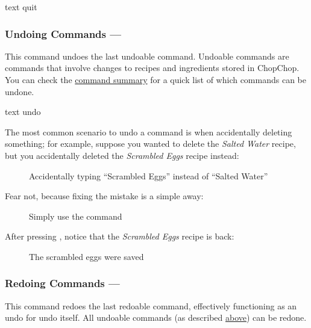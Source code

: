 	 \begin{blockofcode}{text}
		quit
	\end{blockofcode}




\hypertarget{UndoCommand}{}
\subsubsection{Undoing Commands — \texttt{}}

	This command undoes the last undoable command. Undoable commands are commands that involve changes to recipes and ingredients stored in ChopChop. You can check the \hyperlink{CommandSummary}{command summary} for a quick list of which commands can be undone.

	 \begin{blockofcode}{text}
		undo
	\end{blockofcode}

	The most common scenario to undo a command is when accidentally deleting something; for example, suppose you wanted to delete the
	\emph{Salted Water} recipe, but you accidentally deleted the \emph{Scrambled Eggs} recipe instead:

	\begin{figure}[!htbp]\centering\ContinuedFloat*
		\caption{Accidentally typing \enquote{Scrambled Eggs} instead of \enquote{Salted Water}}
	\end{figure}

	\pagebreak
	Fear not, because fixing the mistake is a simple  away:

	\begin{figure}[!htbp]\centering\ContinuedFloat
		\caption{Simply use the  command}
	\end{figure}

	After pressing , notice that the \emph{Scrambled Eggs} recipe is back:

	\begin{figure}[!htbp]\centering\ContinuedFloat
		\caption{The scrambled eggs were saved}
		\vspace{-2em} %
	\end{figure}

\pagebreak
\hypertarget{RedoCommand}{}
\subsubsection{Redoing Commands — \texttt{}}
	This command redoes the last redoable command, effectively functioning as an undo for undo itself. All undoable commands
	(as described \hyperlink{UndoCommand}{above}) can be redone.

